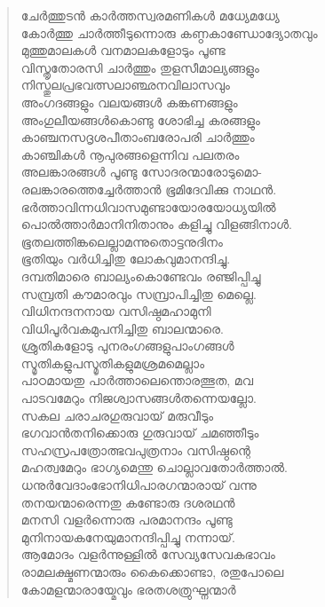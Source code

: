 \begin{verse}
ചേര്‍ത്തുടന്‍ കാര്‍ത്തസ്വരമണികള്‍ മധ്യേമധ്യേ\\
കോര്‍ത്തു ചാര്‍ത്തീടുന്നൊരു കണ്ഠകാണ്ഡോദ്യോതവും\\
മുത്തുമാലകള്‍ വനമാലകളോടും പൂണ്ട\\
വിസ്തൃതോരസി ചാര്‍ത്തും തുളസീമാല്യങ്ങളും\\
നിസ്തുലപ്രഭവത്സലാഞ്ഛനവിലാസവും\\
അംഗദങ്ങളും വലയങ്ങള്‍ കങ്കണങ്ങളും\\
അംഗുലീയങ്ങള്‍കൊണ്ടു ശോഭിച്ച കരങ്ങളും\\
കാഞ്ചനസദൃശപീതാംബരോപരി ചാര്‍ത്തും\\
കാഞ്ചികള്‍ നൂപുരങ്ങളെന്നിവ പലതരം\\
അലങ്കാരങ്ങള്‍ പൂണ്ടു സോദരന്മാരോടുമൊ-\\
രലങ്കാരത്തെച്ചേര്‍ത്താന്‍ ഭൂമിദേവിക്കു നാഥന്‍.\\
ഭര്‍ത്താവിന്നധിവാസമുണ്ടായോരയോധ്യയില്‍\\
പൊല്‍ത്താര്‍മാനിനിതാനും കളിച്ചു വിളങ്ങിനാള്‍.\\
ഭൂതലത്തിങ്കലെല്ലാമന്നുതൊട്ടനുദിനം\\
ഭൂതിയും വര്‍ധിച്ചിതു ലോകവുമാനന്ദിച്ചു.\\
ദമ്പതിമാരെ ബാല്യംകൊണ്ടേവം രഞ്ജിപ്പിച്ചു\\
സമ്പ്രതി കൗമാരവും സമ്പ്രാപിച്ചിതു മെല്ലെ.\\
വിധിനന്ദനനായ വസിഷ്ഠമഹാമുനി\\
വിധിപൂര്‍വകമുപനിച്ചിതു ബാലന്മാരെ.\\
ശ്രുതികളോടു പുനരംഗങ്ങളുപാംഗങ്ങള്‍\\
സ്മൃതികളുപസ്മൃതികളുമശ്രമമെല്ലാം\\
പാഠമായതു പാര്‍ത്താലെന്തൊരത്ഭുത, മവ\\
പാടവമേറും നിജശ്വാസങ്ങള്‍തന്നെയല്ലോ.\\
സകല ചരാചരഗുരുവായ് മരുവീടും\\
ഭഗവാന്‍തനിക്കൊരു ഗുരുവായ് ചമഞ്ഞീടും\\
സഹസ്രപത്രോത്ഭവപുത്രനാം വസിഷ്ഠന്റെ\\
മഹത്വമേറും ഭാഗ്യമെന്തു ചൊല്ലാവതോര്‍ത്താല്‍.\\
ധനുര്‍വേദാംഭോനിധിപാരഗന്മാരായ് വന്നു\\
തനയന്മാരെന്നതു കണ്ടോരു ദശരഥന്‍\\
മനസി വളര്‍ന്നൊരു പരമാനന്ദം പൂണ്ടു\\
മുനിനായകനേയുമാനന്ദിപ്പിച്ചു നന്നായ്.\\
ആമോദം വളര്‍ന്നുള്ളില്‍ സേവ്യസേവകഭാവം\\
രാമലക്ഷ്മണന്മാരും കൈക്കൊണ്ടാ, രതുപോലെ\\
കോമളന്മാരായ്മേവും ഭരതശത്രുഘ്നന്മാര്‍\\

\end{verse}
